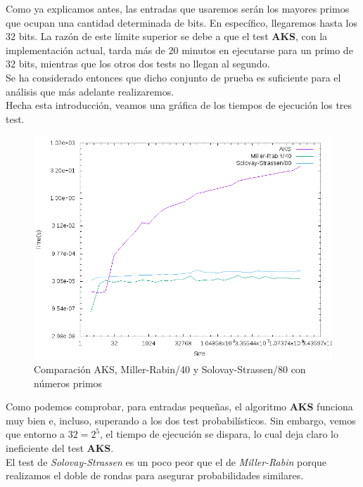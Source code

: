 Como ya explicamos antes, las entradas que usaremos serán los mayores primos que ocupan una cantidad determinada de bits. En específico, llegaremos hasta los $32$ bits. La razón de este límite superior se debe a que el test \textbf{AKS}, con la implementación actual, tarda más de $20$ minutos en ejecutarse para un primo de $32$ bits, mientras que los otros dos tests no llegan al segundo.\\

Se ha considerado entonces que dicho conjunto de prueba es suficiente para el análisis que más adelante realizaremos.\\

Hecha esta introducción, veamos una gráfica de los tiempos de ejecución los tres test.

\begin{figure}[H]
	\centering
	\includegraphics[totalheight=12cm]{img/graphs/aks-probs-primes-mean}
	\caption{Comparación AKS, Miller-Rabin/40 y Solovay-Strassen/80 con números primos}
\end{figure}

Como podemos comprobar, para entradas pequeñas, el algoritmo \textbf{AKS} funciona muy bien e, incluso, superando a los dos test probabilísticos. Sin embargo, vemos que entorno a $32 = 2^5$, el tiempo de ejecución se dispara, lo cual deja claro lo ineficiente del test \textbf{AKS}.\\

El test de \textit{Solovay-Strassen} es un poco peor que el de \textit{Miller-Rabin} porque realizamos el doble de rondas para asegurar probabilidades similares.\\

